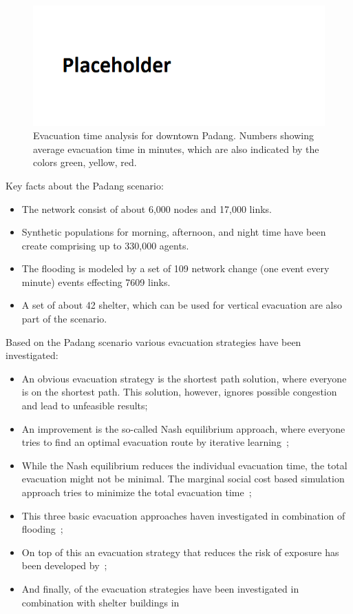 \begin{figure}[!ht]
\centering
\includegraphics[width=.6\linewidth]{using/figures/dwntwnpdg}
\caption{Evacuation time analysis for downtown Padang. Numbers showing average evacuation time in minutes, which are also indicated by the colors green, yellow, red.}\label{chap:evac:fig:sc_man}
\end{figure}

Key facts about the Padang scenario:
\begin{itemize}
\item The network consist of about 6,000 nodes and 17,000 links.
\item Synthetic populations for morning, afternoon, and night time have been create comprising up to 330,000 agents.
\item The flooding is modeled by a set of 109 network change (one event every minute) events effecting 7609 links.
\item A set of about 42 shelter, which can be used for vertical evacuation are also part of the scenario.
\end{itemize}
Based on the Padang scenario various evacuation strategies have been investigated:
\begin{itemize}
\item An obvious evacuation strategy is the shortest path solution, where everyone is on the shortest path. This solution, however, ignores possible congestion and lead to unfeasible results;
\item  An improvement is the so-called Nash equilibrium approach, where everyone tries to find an optimal evacuation route by iterative learning~\citep{LaemmelKluepfelNagel2009EvacPadangAtBookTimmermanns};
\item While the Nash equilibrium reduces the individual evacuation time, the total evacuation might not be minimal. The marginal social cost based simulation approach tries to minimize the total evacuation time~\citep{LaemmelFloetteroed_MertschingEtAl_2009,DresslerFloetteroedLaemmelNagelSkutella2010OptimalEvacuationLargeScaleScenarios};
\item This three basic evacuation approaches haven investigated in combination of flooding~\citep{LaemmelEtAl_TransResC_2010};
\item On top of this an evacuation strategy that reduces the risk of exposure has been developed by~\citep{LaemmelKluepfelNagel2010PEDRiskPrinted};
\item And finally, of the evacuation strategies have been investigated in combination with shelter buildings in~\citep{FloetteroedLaemmel2010ICECShelterEvac}
\end{itemize}
